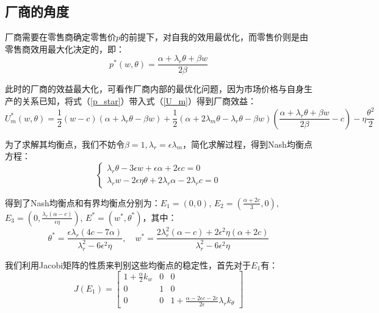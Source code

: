 \documentclass{article}
\begin{document}
\subsection{厂商的角度}
\par 厂商需要在零售商确定零售价$p$的前提下，对自我的效用最优化，而零售价则是由零售商效用最大化决定的，即：
\begin{equation}\label{p_star}
    p^*(w,\theta)=\frac{\alpha+\lambda_r\theta+\beta w}{2\beta}
\end{equation}
\par 此时的厂商的效益最大化，可看作厂商内部的最优化问题，因为市场价格与自身生产的关系已知，将式（\ref{p_star}）带入式（\ref{U_m}）得到厂商效益：
\begin{equation}
    U_m^*(w,\theta)=\frac{1}{2}(w-c)(\alpha+\lambda_r\theta-\beta w)+\frac{1}{2}(\alpha+2\lambda_m\theta-\lambda_r\theta-\beta w)(\frac{\alpha+\lambda_r\theta+\beta w}{2\beta}-c)-\eta\frac{\theta^2}{2}
\end{equation}
\par 为了求解其均衡点，我们不妨令$\beta=1, \lambda_r=\epsilon\lambda_m$，简化求解过程，得到Nash均衡点方程：
\begin{equation}  
    \left\{  
        \begin{array}{lr}
            \lambda_r\theta-3\epsilon w+\epsilon\alpha+2\epsilon c=0               \\  
            \lambda_rw-2\epsilon\eta\theta+2\lambda_r\alpha-2\lambda_rc=0   
        \end{array}  
    \right. 
\end{equation} 
\par 得到了Nash均衡点和有界均衡点分别为：$E_1=(0,0)$, $E_2=(\frac{\alpha+2c}{3},0)$, $E_3=(0,\frac{\lambda_r(\alpha-c)}{\epsilon\eta})$, $E^*=(w^*,\theta^*)$，其中：
$$\theta^*=\frac{\epsilon\lambda_r(4c-7\alpha)}{\lambda_r^2-6\epsilon^2\eta},\quad
w^*=\frac{2\lambda_r^2(\alpha-c)+2\epsilon^2\eta(\alpha+2c)}{\lambda_r^2-6\epsilon^2\eta}$$
\par 我们利用Jacobi矩阵的性质来判别这些均衡点的稳定性\cite{2017Tang}\cite{2018Li}，首先对于$E_1$有：
\begin{equation}\label{jacobi_1}
    J(E_1)=
    \left[
    \begin{array}{ccc}
        1+\frac{\alpha}{2}k_w&0&0\\
        0&1&0\\
        0&0&1+\frac{\alpha-2\epsilon c-2c}{2\epsilon}\lambda_rk_\theta
    \end{array}
    \right]
\end{equation}
\end{document}
